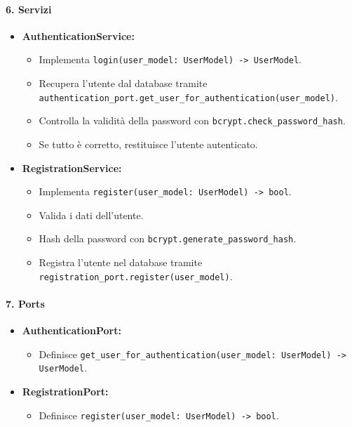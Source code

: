     \paragraph{6. Servizi}
    \begin{itemize}
        \item \textbf{AuthenticationService:}
        \begin{itemize}
            \item Implementa \texttt{login(user\_model: UserModel) -> UserModel}.
            \item Recupera l'utente dal database tramite \\
                \texttt{authentication\_port.get\_user\_for\_authentication(user\_model)}.
            \item Controlla la validità della password con \texttt{bcrypt.check\_password\_hash}.
            \item Se tutto è corretto, restituisce l'utente autenticato.
        \end{itemize}
        \item \textbf{RegistrationService:}
        \begin{itemize}
            \item Implementa \texttt{register(user\_model: UserModel) -> bool}.
            \item Valida i dati dell'utente.
            \item Hash della password con \texttt{bcrypt.generate\_password\_hash}.
            \item Registra l'utente nel database tramite \texttt{registration\_port.register(user\_model)}.
        \end{itemize}
    \end{itemize}

    \paragraph{7. Ports}
    \begin{itemize}
        \item \textbf{AuthenticationPort:}
        \begin{itemize}
            \item Definisce \texttt{get\_user\_for\_authentication(user\_model: UserModel) -> UserModel}.
        \end{itemize}
        \item \textbf{RegistrationPort:}
        \begin{itemize}
            \item Definisce \texttt{register(user\_model: UserModel) -> bool}.
        \end{itemize}
    \end{itemize}

